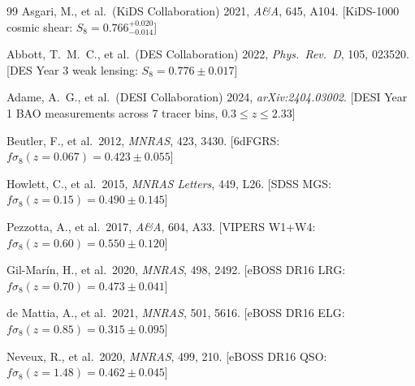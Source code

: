 \documentclass[12pt,a4paper]{article}
\begin{document}
\begin{thebibliography}{99}
Asgari, M., et al.\ (KiDS Collaboration) 2021,
\textit{A\&A}, 645, A104.
[KiDS-1000 cosmic shear: $S_8 = 0.766^{+0.020}_{-0.014}$]

Abbott, T.~M.~C., et al.\ (DES Collaboration) 2022,
\textit{Phys.\ Rev.\ D}, 105, 023520.
[DES Year 3 weak lensing: $S_8 = 0.776 \pm 0.017$]

Adame, A.~G., et al.\ (DESI Collaboration) 2024,
\textit{arXiv:2404.03002}.
[DESI Year 1 BAO measurements across 7 tracer bins, $0.3\leq z\leq 2.33$]

Beutler, F., et al.\ 2012, \textit{MNRAS}, 423, 3430.
[6dFGRS: $f\sigma_8(z=0.067)=0.423\pm0.055$]

Howlett, C., et al.\ 2015, \textit{MNRAS Letters}, 449, L26.
[SDSS MGS: $f\sigma_8(z=0.15)=0.490\pm0.145$]

Pezzotta, A., et al.\ 2017, \textit{A\&A}, 604, A33.
[VIPERS W1+W4: $f\sigma_8(z=0.60)=0.550\pm0.120$]

Gil-Mar\'in, H., et al.\ 2020, \textit{MNRAS}, 498, 2492.
[eBOSS DR16 LRG: $f\sigma_8(z=0.70)=0.473\pm0.041$]

de Mattia, A., et al.\ 2021, \textit{MNRAS}, 501, 5616.
[eBOSS DR16 ELG: $f\sigma_8(z=0.85)=0.315\pm0.095$]

Neveux, R., et al.\ 2020, \textit{MNRAS}, 499, 210.
[eBOSS DR16 QSO: $f\sigma_8(z=1.48)=0.462\pm0.045$]

\end{thebibliography}
\end{document}
